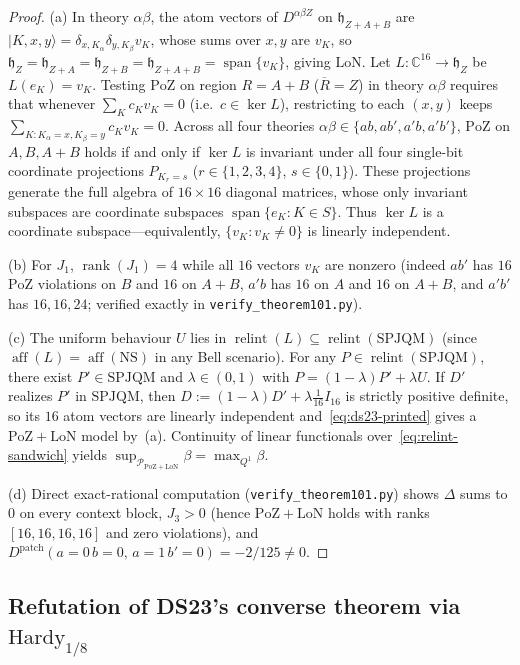 \documentclass[11pt,a4paper]{article}
\theoremstyle{definition}
\theoremstyle{remark}
\newcommand{\SPJQM}{\mathrm{SPJQM}}
\newcommand{\Qone}{Q^{1}}
\newcommand{\PoZ}{\mathrm{PoZ}}
\newcommand{\LoN}{\mathrm{LoN}}
\newcommand{\PPoZ}{\mathcal{P}_{\PoZ+\LoN}}
\newcommand{\ket}[1]{|#1\rangle}
\newcommand{\relint}{\operatorname{relint}}
\newcommand{\aff}{\operatorname{aff}}
\begin{document}
\begin{proof}
(a) In theory $\alpha\beta$, the atom vectors of $D^{\alpha\beta Z}$ on $\mathfrak{h}_{Z+A+B}$ are $\ket{K, x, y} = \delta_{x, K_\alpha}\delta_{y, K_\beta} v_K$, whose sums over $x,y$ are $v_K$, so $\mathfrak{h}_Z = \mathfrak{h}_{Z+A} = \mathfrak{h}_{Z+B} = \mathfrak{h}_{Z+A+B} = \operatorname{span}\{v_K\}$, giving $\LoN$. Let $L : \mathbb{C}^{16} \to \mathfrak{h}_Z$ be $L(e_K) = v_K$. Testing $\PoZ$ on region $R = A+B$ ($\overline{R} = Z$) in theory $\alpha\beta$ requires that whenever $\sum_K c_K v_K = 0$ (i.e.\ $c \in \ker L$), restricting to each $(x,y)$ keeps $\sum_{K : K_\alpha=x, K_\beta=y} c_K v_K = 0$. Across all four theories $\alpha\beta \in \{ab, ab', a'b, a'b'\}$, $\PoZ$ on $A, B, A+B$ holds if and only if $\ker L$ is invariant under all four single-bit coordinate projections $P_{K_r = s}$ ($r \in \{1,2,3,4\}$, $s \in \{0,1\}$). These projections generate the full algebra of $16 \times 16$ diagonal matrices, whose only invariant subspaces are coordinate subspaces $\operatorname{span}\{e_K : K \in S\}$. Thus $\ker L$ is a coordinate subspace---equivalently, $\{v_K : v_K \neq 0\}$ is linearly independent.

(b) For $J_1$, $\operatorname{rank}(J_1) = 4$ while all $16$ vectors $v_K$ are nonzero (indeed $ab'$ has $16$ $\PoZ$ violations on $B$ and $16$ on $A+B$, $a'b$ has $16$ on $A$ and $16$ on $A+B$, and $a'b'$ has $16, 16, 24$; verified exactly in \texttt{verify\_theorem101.py}).

(c) The uniform behaviour $U$ lies in $\relint(L) \subseteq \relint(\SPJQM)$ (since $\aff(L) = \aff(\mathrm{NS})$ in any Bell scenario). For any $P \in \relint(\SPJQM)$, there exist $P' \in \SPJQM$ and $\lambda \in (0,1)$ with $P = (1-\lambda) P' + \lambda U$. If $D'$ realizes $P'$ in $\SPJQM$, then $D := (1-\lambda)D' + \lambda \tfrac{1}{16}I_{16}$ is strictly positive definite, so its $16$ atom vectors are linearly independent and~\eqref{eq:ds23-printed} gives a $\PoZ+\LoN$ model by~(a). Continuity of linear functionals over~\eqref{eq:relint-sandwich} yields $\sup_{\PPoZ} \beta = \max_{\Qone} \beta$.

(d) Direct exact-rational computation (\texttt{verify\_theorem101.py}) shows $\Delta$ sums to $0$ on every context block, $J_3 > 0$ (hence $\PoZ+\LoN$ holds with ranks $[16,16,16,16]$ and zero violations), and $D^{\mathrm{patch}}(a{=}0\,b{=}0,\, a{=}1\,b'{=}0) = -2/125 \neq 0$.
\end{proof}

\subsection{Refutation of DS23's converse theorem via $\mathrm{Hardy}_{1/8}$}
\end{document}
